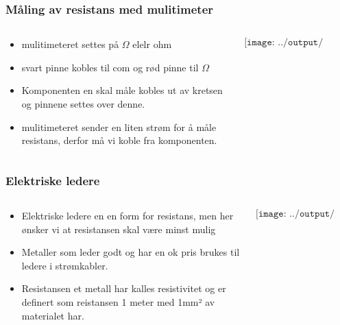 \documentclass[aspectratio=169,xcolor=dvipsnames]{beamer}
\begin{document}
\begin{frame}
	\frametitle{Måling av resistans med mulitimeter}

	\begin{columns}
		\begin{column}{0.4\textwidth}
			\begin{itemize}
				\item mulitimeteret settes på $\Omega$ elelr ohm
				\item svart pinne kobles til com og rød pinne til $\Omega$
				\item Komponenten en skal måle kobles ut av kretsen og pinnene settes over denne. 
				\item mulitimeteret sender en liten strøm for å måle resistans, derfor må vi koble fra komponenten. 
			\end{itemize}
		\end{column}

		\begin{column}{0.6\textwidth}
			$$\texttt{[image: ../output/noGPLimages/tifel18.png]}$$
		\end{column}
	\end{columns}
\end{frame}

\begin{frame}
	\frametitle{Elektriske ledere}

	\begin{columns}
		\begin{column}{0.7\textwidth}
			\begin{itemize}
				\item Elektriske ledere en en form for resistans, men her ønsker vi at resistansen skal være minst mulig
				\item Metaller som leder godt og har en ok pris brukes til ledere i strømkabler. 
				\item Resistansen et metall har kalles resistivitet og er definert som reistansen 1 meter med 1mm² av materialet har. 
			\end{itemize}
		\end{column}

		\begin{column}{0.3\textwidth}
			$$\texttt{[image: ../output/noGPLimages/tifel19.png]}$$
		\end{column}
	\end{columns}
\end{frame}
\end{document}
